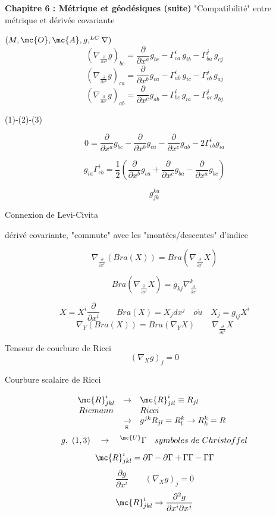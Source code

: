 
{\bf Chapitre 6 : Métrique et géodésiques (suite)}
"Compatibilité" entre métrique et dérivée covariante

$(M, \mc{O}, \mc{A}, g, ^{LC}\nabla)$
\[
\tag{1}(\nabla_{\frac{\partial}{\partial x^a}}g)_{bc} =
\frac{\partial}{\partial x^a} g_{bc}-\Gamma^i_{ca}\,g_{ib}-\Gamma^j_{ba}\,g_{cj}
\]
\[
\tag{2}(\nabla_{\frac{\partial}{\partial x^b}}g)_{ca} =
\frac{\partial}{\partial x^b} g_{ca}-\Gamma^i_{ab}\,g_{ic}-\Gamma^j_{cb}\,g_{aj}
\]
\[
\tag{3}(\nabla_{\frac{\partial}{\partial x^c}}g)_{ab} =
\frac{\partial}{\partial x^c} g_{ab}-\Gamma^i_{bc}\,g_{ia}-\Gamma^j_{ac}\,g_{bj}
\]

(1)-(2)-(3)


\[
0=\frac{\partial}{\partial x^a} g_{bc}-\frac{\partial}{\partial x^b} g_{ca}
-\frac{\partial}{\partial x^c} g_{ab}-2\Gamma^i_{cb}g_{ia}
\]

\[
g_{ia}\Gamma^i_{cb}=\frac{1}{2}\left(\frac{\partial}{\partial x^b} g_{ca} +
\frac{\partial}{\partial x^c} g_{ba}-\frac{\partial}{\partial x^a} g_{bc}\right)
\]

\[
g^{ka}_{jk}
\]

Connexion de Levi-Civita

dérivé covariante, "commute" avec les "montées/descentes" d'indice

\[
\nabla_{\frac{\partial}{\partial x^i}}(Bra(X)) =
Bra(\nabla_{\frac{\partial}{\partial x^i}}X)
\]

\[
Bra(\nabla_{\frac{\partial}{\partial x^i}}X) =
g_{kj}\nabla_{\frac{\partial}{\partial x^i}}^k
\]

\[
X = X^i\frac{\partial}{\partial x^i} \qquad Bra(X) = X_jdx^j \quad
o\grave u  \quad X_j = g_{ij}X^i
\]
\[
\nabla_Y(Bra(X))=Bra(\nabla_YX) \qquad \nabla_{\frac{\partial}{\partial x^i}}X
\]

Tenseur de courbure de Ricci
\[
(\nabla_Xg)_j=0
\]


Courbure scalaire de Ricci

\[
\begin{array}{ c c l }
 \mc{R}^i_{jkl} & \to & \mc{R}^i_{jil} \equiv R_{jl} \\
  Riemann &  & Ricci \\
    & \xrightarrow[\text{g}]{} & g^{jk}R_{jl} = R^k_l \to R^k_k=R \\
\end{array}
\ \ 
\]
\[
g,\ (1,3) \quad \to \quad ^\mc{U}\Gamma \quad symboles\ de\ Christoffel
\]
\[
\mc{R}^i_{jkl}=\partial\Gamma-\partial\Gamma+\Gamma\Gamma-\Gamma\Gamma
\]
\[
\frac{\partial g}{\partial x^i} \qquad (\nabla _X g)_j=0
\]
\[
\mc{R}^i_{jkl} \to \frac{\partial ^2g}{\partial x^i\partial x^j}
\]

